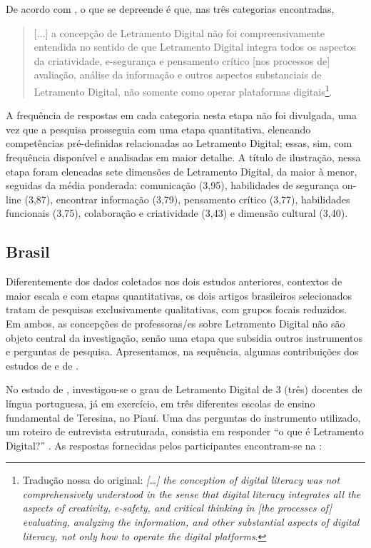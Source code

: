 \documentclass[portuguese]{textolivre}
\begin{document}
De acordo com \textcite[p.~191]{nabhan_pre-service_2021}, o que se depreende é que, nas três categorias encontradas,

\begin{quote}
[...] a concepção de Letramento Digital não foi compreensivamente entendida no sentido de que Letramento Digital integra todos os aspectos da criatividade, e-segurança e pensamento crítico [nos processos de] avaliação, análise da informação e outros aspectos substanciais de Letramento Digital, não somente como operar plataformas digitais\footnote{Tradução nossa do original: \textit{[…] the conception of digital literacy was not comprehensively understood in the sense that digital literacy integrates all the aspects of creativity, e-safety, and critical thinking in [the processes of] evaluating, analyzing the information, and other substantial aspects of digital literacy, not only how to operate the digital platforms}.}.
\end{quote}

A frequência de respostas em cada categoria nesta etapa não foi divulgada, uma vez que a pesquisa prosseguia com uma etapa quantitativa, elencando competências pré-definidas relacionadas ao Letramento Digital; essas, sim, com frequência disponível e analisadas em maior detalhe. A título de ilustração, nessa etapa foram elencadas sete dimensões de Letramento Digital, da maior à menor, seguidas da média ponderada: comunicação (3,95), habilidades de segurança on-line (3,87), encontrar informação (3,79), pensamento crítico (3,77), habilidades funcionais (3,75), colaboração e criatividade (3,43) e dimensão cultural (3,40).

\subsection{Brasil \cite{santos_o_2017,_santos_letramento_2018}}

Diferentemente dos dados coletados nos dois estudos anteriores, contextos de maior escala e com etapas quantitativas, os dois artigos brasileiros selecionados tratam de pesquisas exclusivamente qualitativas, com grupos focais reduzidos. Em ambos, as concepções de professoras/es sobre Letramento Digital não são objeto central da investigação, senão uma etapa que subsidia outros instrumentos e perguntas de pesquisa. Apresentamos, na sequência, algumas contribuições dos estudos de \textcite{santos_o_2017} e de \textcite{_santos_letramento_2018}.

No estudo de \textcite{santos_o_2017}, investigou-se o grau de Letramento Digital de 3 (três) docentes de língua portuguesa, já em exercício, em três diferentes escolas de ensino fundamental de Teresina, no Piauí. Uma das perguntas do instrumento utilizado, um roteiro de entrevista estruturada, consistia em responder “o que é Letramento Digital?” \cite[p.~85]{santos_o_2017}. As respostas fornecidas pelos participantes encontram-se na :
\end{document}
